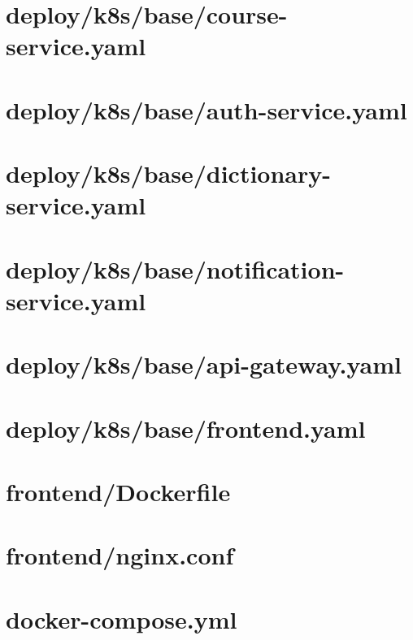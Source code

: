 \section*{deploy/k8s/base/course-service.yaml}


\section*{deploy/k8s/base/auth-service.yaml}


\section*{deploy/k8s/base/dictionary-service.yaml}


\section*{deploy/k8s/base/notification-service.yaml}


\section*{deploy/k8s/base/api-gateway.yaml}


\section*{deploy/k8s/base/frontend.yaml}


\section*{frontend/Dockerfile}


\section*{frontend/nginx.conf}


\section*{docker-compose.yml}



